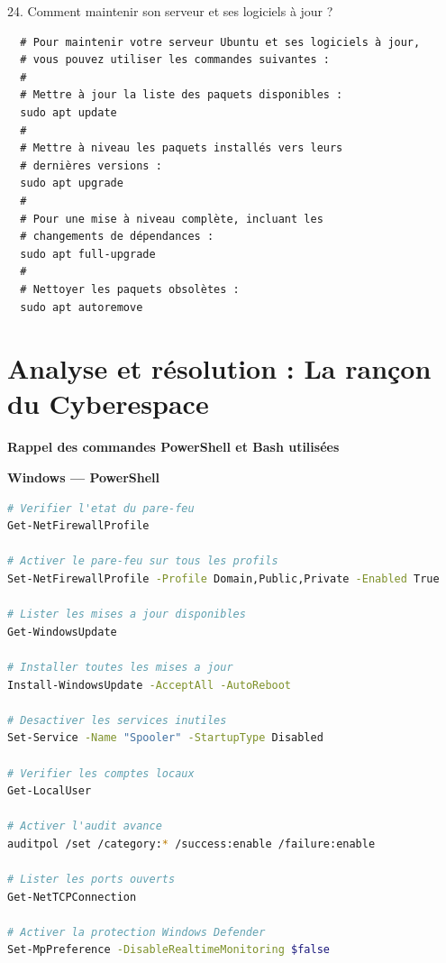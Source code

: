 24. Comment maintenir son serveur et ses logiciels à jour ?

\begin{center}
  \begin{verbatim}
  # Pour maintenir votre serveur Ubuntu et ses logiciels à jour,
  # vous pouvez utiliser les commandes suivantes :
  #
  # Mettre à jour la liste des paquets disponibles :
  sudo apt update
  #
  # Mettre à niveau les paquets installés vers leurs
  # dernières versions :
  sudo apt upgrade
  #
  # Pour une mise à niveau complète, incluant les
  # changements de dépendances :
  sudo apt full-upgrade
  #
  # Nettoyer les paquets obsolètes :
  sudo apt autoremove
  \end{verbatim}
\end{center}

\newpage


\section*{Analyse et résolution : La rançon du Cyberespace}

\noindent\textbf{Rappel des commandes PowerShell et Bash utilisées}

\noindent\textbf{Windows — PowerShell}

\begin{lstlisting}[language=bash]
# Verifier l'etat du pare-feu
Get-NetFirewallProfile

# Activer le pare-feu sur tous les profils
Set-NetFirewallProfile -Profile Domain,Public,Private -Enabled True

# Lister les mises a jour disponibles
Get-WindowsUpdate

# Installer toutes les mises a jour
Install-WindowsUpdate -AcceptAll -AutoReboot

# Desactiver les services inutiles
Set-Service -Name "Spooler" -StartupType Disabled

# Verifier les comptes locaux
Get-LocalUser

# Activer l'audit avance
auditpol /set /category:* /success:enable /failure:enable

# Lister les ports ouverts
Get-NetTCPConnection

# Activer la protection Windows Defender
Set-MpPreference -DisableRealtimeMonitoring $false
\end{lstlisting}

\vspace{1cm}

